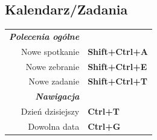\documentclass[12pt]{article}
\begin{document}
\begin{landscape}
\begin{center}
\begin{multicols}{2}
	\section*{Kalendarz/Zadania}
	\begin{tabular*}{4in}{rp{1.5in}}
		\textit{\textbf{Polecenia ogólne}}	&					\\
		Nowe spotkanie				& \textbf{Shift+Ctrl+A}			\\
		Nowe zebranie				& \textbf{Shift+Ctrl+E}			\\
		\vspace{1.5mm}
		Nowe zadanie				& \textbf{Shift+Ctrl+T}			\\
		\textit{\textbf{Nawigacja}}		&					\\
		Dzień dzisiejszy			& \textbf{Ctrl+T}			\\
		Dowolna data				& \textbf{Ctrl+G}			\\
	\end{tabular*}
	\end{multicols}
	\end{center}
	\end{landscape}
 
\end{document}
